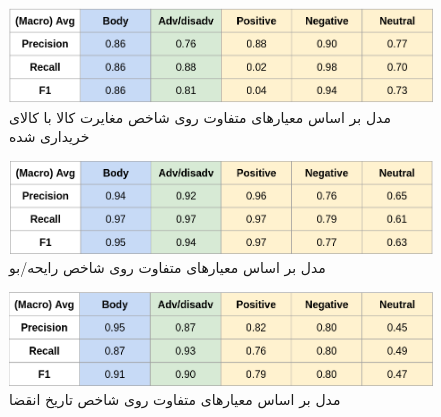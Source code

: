 
\begin{figure}[H]
\centering
\includegraphics[width=15cm]{figs/discrepcency.png}
\caption{ ‌مدل بر اساس معیارهای متفاوت روی شاخص مغایرت کالا با کالای خریداری شده}\label{}
\label{fig:test}
\end{figure}



\begin{figure}[H]
\centering
\includegraphics[width=15cm]{figs/flavor.png}
\caption{ ‌مدل بر اساس معیارهای متفاوت روی شاخص رایحه/بو}\label{}
\label{fig:test}
\end{figure}




\begin{figure}[H]
\centering
\includegraphics[width=15cm]{figs/expire.png}
\caption{ ‌مدل بر اساس معیارهای متفاوت روی شاخص تاریخ انقضا}\label{}
\label{fig:test}
\end{figure}
